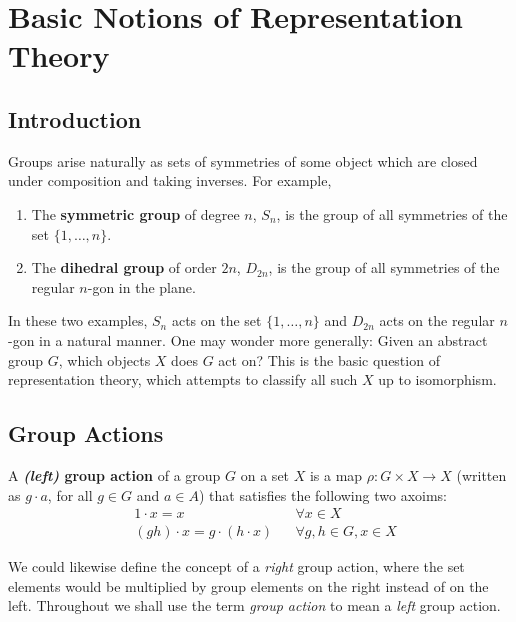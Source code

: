 
\chapter{Basic Notions of Representation Theory} %




\section{Introduction}
Groups arise naturally as sets of symmetries of some object which are closed under composition and taking inverses.  For example, 
\begin{enumerate}
\item The \textbf{symmetric group} of degree $n$, $S_n$, is the group of all symmetries of the set $\{ 1, \ldots, n \}$.
\item The \textbf{dihedral group} of order $2n$, $D_{2n}$, is the group of all symmetries of the regular $n$-gon in the plane.
\end{enumerate}
In these two examples, $S_n$  acts on the set $\{ 1, \ldots, n \}$ and $D_{2n}$ acts on the regular $n$-gon in a natural manner. One may wonder more generally:  Given an abstract group $G$, which objects $X$ does $G$ act on?
This is the basic question of representation theory, which attempts to classify all such $X$ up to isomorphism.

%
\section {Group Actions}
\begin{defn}\label{def-grp-action}
A  \textbf{\textit{(left)} group action} of a group $G$ on a set $X$ is a map $\rho \colon G \times X \to X$ (written as $g \cdot a$, for all $g \in G$ and $a \in A$) that satisfies the following two axoims:
\begin{align}
\label{grp-action-axiom-1}&1 \cdot  x = x && \forall x \in X\\
\label{grp-action-axiom-2}&(gh) \cdot x  = g \cdot (h \cdot x) && \forall g,h \in G, x \in X
\end{align}
\end{defn}
\begin{note}
We could likewise define the concept of a \textit{right} group action, where the set elements would be multiplied by group elements on the right instead of on the left.  Throughout we shall use the term \textit{group action} to mean a \textit{left} group action.
\end{note}


